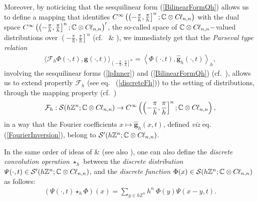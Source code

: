 \documentclass{elsarticle}
\newcommand{\BC}{{\mathbb C}}
\newcommand{\BZ}{{\mathbb Z}}
\newcommand{\Qh}{\left(-\frac{\pi}{h},\frac{\pi}{h}\right]^n}
\newcommand{\g}{\textbf{g}}
\newcommand{\cl}{C \kern -0.1em \ell}
\begin{document}
Moreover, by noticicing that the sesquilinear form (\ref{BilinearFormQh}) allows us to define a mapping that identifies $C^\infty\left(\Qh;\BC\otimes \cl_{n,n}\right)$ with the dual space $C^\infty\left(\Qh;\BC \otimes \cl_{n,n}\right)'$, the so-called space of $\BC\otimes \cl_{n,n}-$valued distributions over $\Qh$ (cf.~\cite[Exercise 3.1.15.]{RuzhanskyT10} \&  \cite[Definition 3.1.25]{RuzhanskyT10}),
we immediately get that the \textit{Parseval type relation}
\begin{eqnarray}
	\label{Parseval}	\langle \mathcal{F}_{h} \varPhi(\cdot,t),\g(\cdot,t
	)\rangle_{\Qh}=\left\langle \varPhi(\cdot,t),\widehat{\g}_{h}(\cdot,t)\right\rangle_{h},
\end{eqnarray}
involving the sesquilinear forms (\ref{lpInner}) and (\ref{BilinearFormQh}) (cf.~\cite[Definition 3.1.27]{RuzhanskyT10}), allows us to extend propertly $\mathcal{F}_{h}$ (see eq.~ (\ref{discreteFh})) to the setting of distributions, through the mapping property (cf.~\cite[Definition 3.1.27 \& 3.1.28]{RuzhanskyT10})
$$\mathcal{F}_{h}:\mathcal{S}(h\BZ^n;\BC\otimes \cl_{n,n})\rightarrow C^\infty\left(\Qh;\BC \otimes \cl_{n,n}\right),$$
in a way that the Fourier coefficients $x\mapsto \widehat{\g}_{h}(x,t)$, defined {\it viz} eq. (\ref{FourierInversion}), belong to $\mathcal{S}'(h\BZ^n;\BC\otimes \cl_{n,n})$.


In the same order of ideas of \cite[Subsection 21.1.3]{F19} \& \cite[Subsection 2.2]{F20} (see also \cite[Section 6]{CiaurriGRTV17}), one can also define the \textit{discrete convolution operation} $\star_{h}$ between the \textit{discrete distribution} $\varPsi(\cdot,t)\in \mathcal{S}'(h\BZ^n;\BC \otimes \cl_{n,n})$, and the \textit{discrete function} $\Phi(x)\in \mathcal{S}(h\BZ^n;\BC \otimes \cl_{n,n})$ as follows:
\begin{eqnarray}
	\label{discreteConvolution} \left(\varPsi(\cdot,t)\star_{h} \Phi\right)(x)=\sum_{y\in h\BZ^n} h^n~ \Phi(y)\varPsi(x-y,t).
\end{eqnarray}
\end{document}
